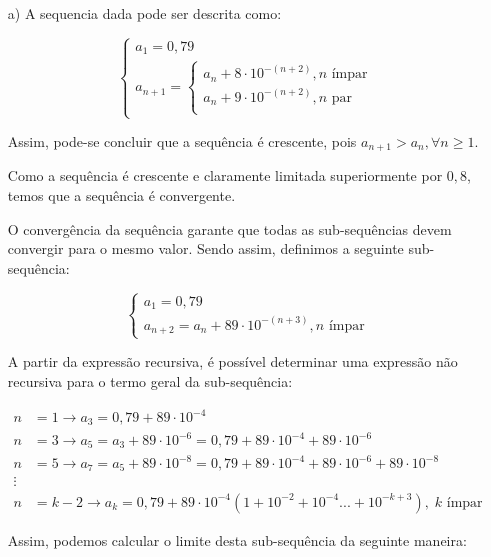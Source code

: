 \documentclass[12pt,a4paper]{article}
\begin{document}
\begin{itemize}
    \item[a)] A sequencia dada pode ser descrita como:
    
    $$
    \begin{cases}
    a_1 = 0,79 \\
    a_{n+1} =
        \begin{cases}
        a_n + 8 \cdot 10^{-(n+2)}, \text{$n$ ímpar} \\
        a_n + 9 \cdot 10^{-(n+2)}, \text{$n$ par} \\
        \end{cases}  
    \end{cases}
    $$
    
    Assim, pode-se concluir que a sequência é crescente, pois $a_{n+1} > a_n, \forall n \geq 1$. 
    
    Como a sequência é crescente e claramente limitada superiormente por $0,8$, temos que a sequência é convergente.
    
    O convergência da sequência garante que todas as sub-sequências devem convergir para o mesmo valor. Sendo assim, definimos a seguinte sub-sequência:
    
    $$
    \begin{cases}
    a_1 = 0,79 \\
    a_{n+2} =  a_n + 89 \cdot 10^{-(n+3)}, \text{$n$ ímpar}
    \end{cases}
    $$
    
    A partir da expressão recursiva, é possível determinar uma expressão não recursiva para o termo geral da sub-sequência:
    
    \begin{align*} 
    n &= 1 \rightarrow a_3 = 0,79 + 89 \cdot 10^{-4} \\ 
    n &= 3 \rightarrow a_5 = a_3 + 89 \cdot 10^{-6} = 0,79 + 89 \cdot 10^{-4} + 89 \cdot 10^{-6} \\
    n &= 5 \rightarrow a_7 = a_5 + 89 \cdot 10^{-8} = 0,79 + 89 \cdot 10^{-4} + 89 \cdot 10^{-6} + 89 \cdot 10^{-8}\\
    \vdots \\
    n &= k-2 \rightarrow a_k = 0,79 + 89 \cdot 10^{-4}(1 + 10^{-2} + 10^{-4} ... + 10^{-k+3}), \; \text{$k$ ímpar}
    \end{align*}
    
    Assim, podemos calcular o limite desta sub-sequência da seguinte maneira:
    

\end{itemize}
\end{document}
